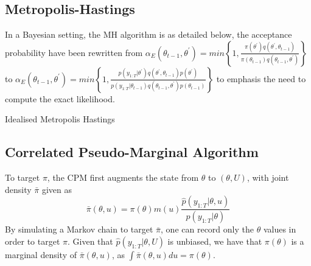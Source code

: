\documentclass{article}
\makeatletter
\def\BState{\State\hskip-\ALG@thistlm}
\makeatother
\begin{document}
\subsection{Metropolis-Hastings}
In a Bayesian setting, the MH algorithm is as detailed below, the acceptance probability have been rewritten from $\alpha_E(\theta_{t-1}, \theta^\prime) = min\left\{1,  \frac{
                \pi(\theta^\prime) q(\theta^\prime, \theta_{t-1})}
                {\pi(\theta_{t-1}) q(\theta_{t-1}, \theta^\prime)}\right\}$ to
 $ \alpha_E(\theta_{t-1}, \theta^\prime) = min\left\{1,  \frac{
                p(y_{1:T}| \theta^\prime) q(\theta^\prime, \theta_{t-1})p(\theta^\prime)}
                {p(y_{1:T}| \theta_{t-1}) q(\theta_{t-1}, \theta^\prime)p(\theta_{t-1})}
\right\} $ to emphasis the need to compute the exact likelihood.

\begin{algorithm}[H]
\caption{Idealised Metropolis Hastings}\label{euclid}
\end{algorithm}


\subsection{Correlated Pseudo-Marginal Algorithm}
To target $\pi$, the CPM first augments the state from $\theta$ to $(\theta, U)$, with joint density $\bar{\pi}$ given as
$$\bar{\pi}(\theta, u) = \pi(\theta)m(u)\frac{\hat{p}(y_{1:T}| \theta, u)}{p(y_{1:T}| \theta)}$$
By simulating a Markov chain to target $\bar{\pi}$, one can record only the $\theta$ values in order to target $\pi$. Given that $\hat{p} (y_{1:T} | \theta, U)$ is unbiased, we have that $\pi(\theta)$ is a marginal density of $\bar{\pi} (\theta, u)$, as $\int \bar{\pi}(\theta,u)du = \pi(\theta)$. \\
\end{document}
